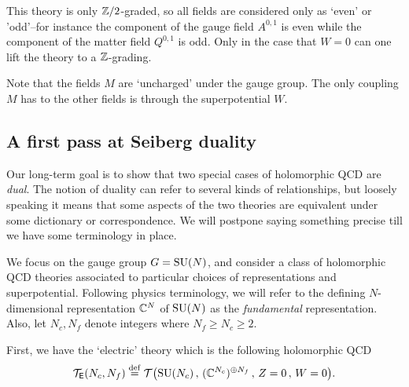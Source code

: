 \documentclass[11pt]{amsart}
\def\SU{{\rm SU}}
\begin{document}
\begin{rmk}
This theory is only $\mathbb Z/2$-graded, so all fields are considered only as `even' or 'odd'--for instance the component of the gauge field $A^{0,1}$ is even while the component of the matter field $Q^{0,1}$ is odd. 
Only in the case that $W = 0$ can one lift the theory to a $\mathbb Z$-grading.
\end{rmk}

\begin{rmk}
Note that the fields $M$ are `uncharged' under the gauge group.
The only coupling $M$ has to the other fields is through the superpotential $W$. 
\end{rmk}

\subsection{A first pass at Seiberg duality}

Our long-term goal is to show that two special cases of holomorphic QCD are {\em dual}.
The notion of duality can refer to several kinds of relationships,
but loosely speaking it means that some aspects of the two theories are equivalent under some dictionary or correspondence.
We will postpone saying something precise till we have some terminology in place.

We focus on the gauge group $G = \SU(N)$, and consider a class of holomorphic QCD theories associated to particular choices of representations and superpotential. 
Following physics terminology, we will refer to the defining $N$-dimensional representation $\mathbb C^N$ of $\SU(N)$ as the {\em fundamental} representation. 
Also, let $N_c, N_f$ denote integers where $N_f \geq N_c \geq 2$.

First, we have the `electric' theory which is the following holomorphic QCD
\[
\cT_{\sfE} (N_c , N_f) \define \cT\big(\SU(N_c) \, ,\, (\CC^{N_c})^{\oplus N_f} \, ,\, Z = 0 \, , \, W = 0\big) .
\]

\end{document}
